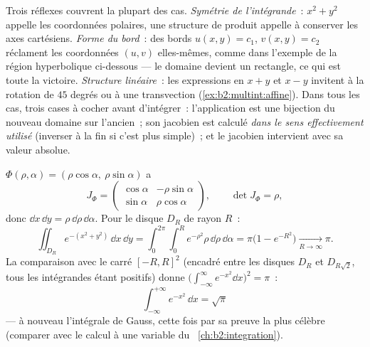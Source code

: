 \begin{remark}
Trois réflexes couvrent la plupart des cas. \emph{Symétrie de
l'intégrande}~: $x^2 + y^2$ appelle les coordonnées polaires, une
structure de produit appelle à conserver les axes cartésiens.
\emph{Forme du bord}~: des bords $u(x,y) = c_1$, $v(x,y) = c_2$
réclament les coordonnées $(u, v)$ elles-mêmes, comme dans l'exemple
de la région hyperbolique ci-dessous --- le domaine devient un
rectangle, ce qui est toute la victoire. \emph{Structure linéaire}~:
les expressions en $x + y$ et $x - y$ invitent à la rotation de
$45$ degrés ou à une transvection (\cref{ex:b2:multint:affine}). Dans
tous les cas, trois cases à cocher avant d'intégrer~: l'application
est une bijection du nouveau domaine sur l'ancien~; son jacobien
est calculé \emph{dans le sens effectivement utilisé} (inverser à
la fin si c'est plus simple)~; et le jacobien intervient avec sa
valeur absolue.
\end{remark}

\begin{example}\label{ex:b2:multint:polar}
$\Phi(\rho, \alpha) = (\rho\cos\alpha,\ \rho\sin\alpha)$ a
\[
J_\Phi = \begin{pmatrix}
\cos\alpha & -\rho\sin\alpha\\
\sin\alpha & \rho\cos\alpha
\end{pmatrix},
\qquad \det J_\Phi = \rho ,
\]
donc $\dd x\,\dd y = \rho\,\dd\rho\,\dd\alpha$. Pour le disque $D_R$
de rayon $R$~:
\[
\iint_{D_R} e^{-(x^2 + y^2)}\,\dd x\,\dd y
= \int_0^{2\pi}\!\!\int_0^R e^{-\rho^2}\rho\,\dd\rho\,\dd\alpha
= \pi\bigl(1 - e^{-R^2}\bigr)
\xrightarrow[R\to\infty]{} \pi .
\]
La comparaison avec le carré $[-R, R]^2$ (encadré entre les disques
$D_R$ et $D_{R\sqrt2}$, tous les intégrandes étant positifs) donne
$\bigl(\int_{-\infty}^\infty e^{-x^2}\dd x\bigr)^2 = \pi$~:
\[
\boxed{\ \int_{-\infty}^{+\infty} e^{-x^2}\,\dd x = \sqrt{\pi}\ }
\]
--- à nouveau l'intégrale de Gauss, cette fois par sa preuve la plus
célèbre (comparer avec le calcul à une variable du~%
\cref{ch:b2:integration}).
\end{example}


